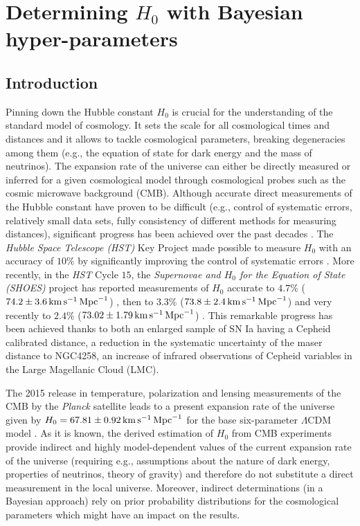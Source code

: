 \chapter{Determining $H_0$ with Bayesian hyper-parameters}
\label{chapter-h0}

\section{Introduction}
\label{chapter-h0:introduction}

Pinning down the Hubble constant $H_0$ is crucial for the understanding of the standard model of cosmology. It sets the scale for all cosmological times and distances and it allows to tackle cosmological parameters, breaking degeneracies among them (e.g., the equation of state for dark energy and the mass of neutrinos). The expansion rate of the universe can either be directly measured or inferred for a given cosmological model through cosmological probes such as the cosmic microwave background (CMB). Although accurate direct measurements of the Hubble constant have proven to be difficult (e.g., control of systematic errors, relatively small data sets, fully consistency of different methods for measuring distances), significant progress has been achieved  
over the past decades \cite{Freedman1996,Freedman:2010xv}. The \textit{Hubble Space Telescope (HST)} Key Project made possible to measure $H_0$ with an accuracy of $10\%$ by significantly improving the control of systematic errors \cite{Freedman2001}.  More recently, in the \textit{HST} Cycle $15$, the \textit{Supernovae and $H_0$ for the Equation of State (SHOES)} project has reported measurements of $H_0$ accurate to $4.7\%$ ($74.2 \pm 3.6 \, \mathrm{km}\, \mathrm{s}^{-1}\, \mathrm{Mpc}^{-1}$) \cite{Riess:2009pu}, then to $3.3\%$ ($73.8 \pm 2.4 \, \mathrm{km}\, \mathrm{s}^{-1}\, \mathrm{Mpc}^{-1}$) \cite{Riess:2011yx} and very recently to $2.4\%$ ($73.02 \pm 1.79 \, \mathrm{km}\, \mathrm{s}^{-1}\, \mathrm{Mpc}^{-1}$) \cite{Riess:2016jrr}. This remarkable progress has been achieved thanks to both an enlarged sample of SN Ia having a Cepheid calibrated distance, a reduction in the systematic uncertainty of the maser distance to NGC4258, an increase of infrared observations of Cepheid variables in the Large Magellanic Cloud (LMC).  

The 2015 release in temperature, polarization and lensing measurements of the CMB by the \textit{Planck} satellite leads to a present expansion rate of the universe given by $H_0 = 67.81 \pm 0.92 \, \mathrm{km} \, \mathrm{s}^{-1}\, \mathrm{Mpc}^{-1}$ for the base six-parameter $\Lambda$CDM model \cite{Ade:2015xua}. As it is known, the derived estimation of $H_0$ from CMB experiments provide indirect and highly model-dependent values of the current expansion rate of the universe (requiring e.g., assumptions about the nature of dark energy, properties of neutrinos, theory of gravity) and therefore do not substitute a direct measurement in the local universe. Moreover, indirect determinations (in a Bayesian approach) rely on prior probability distributions for the cosmological parameters which might have an impact on the results.

